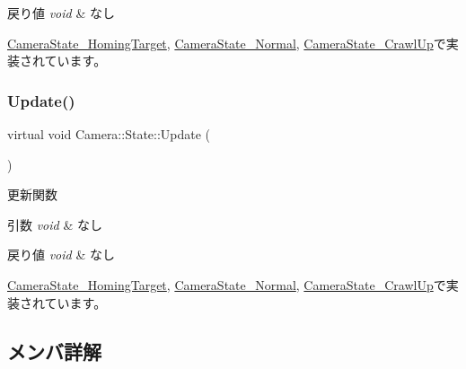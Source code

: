 \begin{DoxyRetVals}{戻り値}
{\em void} & なし \\
\hline
\end{DoxyRetVals}


\mbox{\hyperlink{class_camera_state___homing_target_ab2b5379b35ebafc53189bf4d45646c8c}{Camera\+State\+\_\+\+Homing\+Target}}, \mbox{\hyperlink{class_camera_state___normal_a456267d93f83419f635c6e5c692a79bd}{Camera\+State\+\_\+\+Normal}}, \mbox{\hyperlink{class_camera_state___crawl_up_a046ec18a91e31b210ae000133fa6113a}{Camera\+State\+\_\+\+Crawl\+Up}}で実装されています。

\mbox{\label{class_camera_1_1_state_ab94ec2ba6c56d974cf9e0d7d232948cf}} 
\subsubsection{\texorpdfstring{Update()}{Update()}}
{\footnotesize\ttfamily virtual void Camera\+::\+State\+::\+Update (\begin{DoxyParamCaption}{ }\end{DoxyParamCaption})\hspace{0.3cm}{\ttfamily [pure virtual]}}



更新関数 


\begin{DoxyParams}{引数}
{\em void} & なし \\
\hline
\end{DoxyParams}

\begin{DoxyRetVals}{戻り値}
{\em void} & なし \\
\hline
\end{DoxyRetVals}


\mbox{\hyperlink{class_camera_state___homing_target_a488be0a41b5c00fbfaa56db73aefd45c}{Camera\+State\+\_\+\+Homing\+Target}}, \mbox{\hyperlink{class_camera_state___normal_a52b73e55084b36b1d085b62dc8f15b0a}{Camera\+State\+\_\+\+Normal}}, \mbox{\hyperlink{class_camera_state___crawl_up_a222f184d961d736f86dc4b2a3b227f8e}{Camera\+State\+\_\+\+Crawl\+Up}}で実装されています。



\subsection{メンバ詳解}
\mbox{\label{class_camera_1_1_state_a2e5655fdfb42bda75fe742e759c7001a}} 
